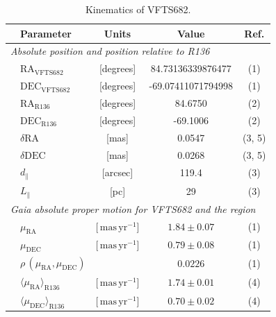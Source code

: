 \documentclass[a4paper,fleqn,usenatbib]{mnras}
\newcommand{\masyr}{\,\mathrm{mas}\,\mathrm{yr}^{-1}}
\begin{document}
\begin{table}
  \begin{center}
    \caption{Kinematics of VFTS682.}
    \vspace*{-9pt}
    \begin{tabular}{llc|c|c}
      \hline
      \hline
      &Parameter & Units & Value & Ref.\\
      \hline
      \multicolumn{5}{l}{\emph{Absolute position and position relative
      to R136}} \\
      \hline
         &$\mathrm{RA}_\mathrm{VFTS682}$&[degrees] & \phantom{-0}84.73136339876477 
                     & (1) \\        
               &$\mathrm{DEC}_\mathrm{VFTS682}$&[degrees] &
                                                            \phantom{0}-69.07411071794998
                     & (1)  \\    
                                                     
                        &$\mathrm{RA}_\mathrm{R136}$&[degrees] & \phantom{00}84.6750
                     &  (2) \\        
               &$     \mathrm{DEC}_\mathrm{R136}$&[degrees] &  \phantom{0}-69.1006
                     &  (2) \\       
        &$      \delta\mathrm{RA}$  &[mas] & \phantom{-00}0.0547                      
        &  (3, 5)
  \\        
               &$     \delta\mathrm{DEC}$  &[mas] & \phantom{-00}0.0268 
                     &  (3, 5) \\  
                       &$  d_\parallel$  & [arcsec]
                         & 119.4
                                 &  (3) \\
      &$L_\parallel$ & [pc] & 29 & (3) \\
      
                          
                     \hline
           \multicolumn{5}{l}{\emph{Gaia absolute proper motion for VFTS682
      and the region}} \\
      \hline
          &$\mu_\mathrm{RA}$&[$\masyr$] & $1.84\pm 0.07$
                     & (1) \\        
               &$\mu_\mathrm{DEC}$&[$\masyr$] & $0.79\pm 0.08$
                     &  (1) \\        
                 & $\rho\,(\mu_\mathrm{RA}, \mu_\mathrm{DEC})$ &  & $0.0226$
                        & (1)  \\         
       &$\langle\mu_\mathrm{RA}\rangle_\mathrm{R136}$&[$\masyr$] & $1.74\pm0.01$
                        & (4) \\
      &$\langle\mu_\mathrm{DEC}\rangle_\mathrm{R136}$&[$\masyr$]
                & $0.70\pm0.02$ &  (4)\\
\hline
      

\end{tabular}
\end{center}
\end{table}
\end{document}

